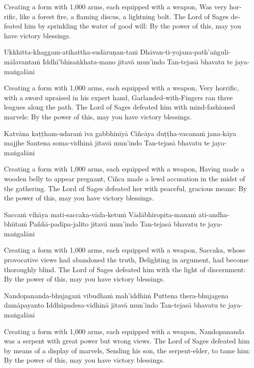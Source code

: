 \begin{english}
  Creating a form with 1,000 arms, each equipped with a weapon,
  Was very horrific, like a forest fire, a flaming discus, a lightning bolt.
  The Lord of Sages defeated him by sprinkling the water of good will:
  By the power of this, may you have victory blessings.
\end{english}

Ukkhitta-khaggam-atihattha-sudāruṇan-taṁ
Dhāvan-ti-yojana-path’aṅguli-mālavantaṁ
Iddhī’bhisaṅkhata-mano jitavā mun’indo
Tan-tejasā bhavatu te jaya-maṅgalāni

\begin{english}
  Creating a form with 1,000 arms, each equipped with a weapon,
  Very horrific, with a sword upraised in his expert hand, Garlanded-with-Fingers ran three leagues along the path.
  The Lord of Sages defeated him with mind-fashioned marvels:
  By the power of this, may you have victory blessings.
\end{english}

Katvāna kaṭṭham-udaraṁ iva gabbhinīyā
Ciñcāya duṭṭha-vacanaṁ jana-kāya majjhe
Santena soma-vidhinā jitavā mun’indo
Tan-tejasā bhavatu te jaya-maṅgalāni

\begin{english}
  Creating a form with 1,000 arms, each equipped with a weapon,
  Having made a wooden belly to appear pregnant,
  Ciñca made a lewd accusation in the midst of the gathering.
  The Lord of Sages defeated her with peaceful, gracious means:
  By the power of this, may you have victory blessings.
\end{english}

Saccaṁ vihāya mati-saccaka-vāda-ketuṁ
Vādābhiropita-manaṁ ati-andha-bhūtaṁ
Paññā-padīpa-jalito jitavā mun’indo
Tan-tejasā bhavatu te jaya-maṅgalāni

\begin{english}
  Creating a form with 1,000 arms, each equipped with a weapon,
  Saccaka, whose provocative views had abandoned the truth, Delighting in argument, had become thoroughly blind.
  The Lord of Sages defeated him with the light of discernment:
  By the power of this, may you have victory blessings.
\end{english}

Nandopananda-bhujagaṁ vibudhaṁ mah’iddhiṁ
Puttena thera-bhujagena damāpayanto
Iddhūpadesa-vidhinā jitavā mun’indo
Tan-tejasā bhavatu te jaya-maṅgalāni

\begin{english}
  Creating a form with 1,000 arms, each equipped with a weapon,
  Nandopananda was a serpent with great power but wrong views.
  The Lord of Sages defeated him by means of a display of marvels, Sending his son, the serpent-elder, to tame him:
  By the power of this, may you have victory blessings.
\end{english}


